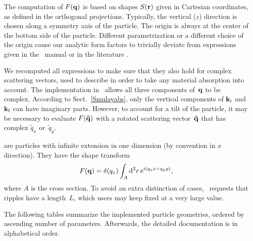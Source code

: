 The computation of $F(\mathbf{q})$ is based on
shapes $S(\mathbf{r})$ given in Cartesian coordinates,
as defined in the orthogonal projections.
Typically, the vertical ($z$) direction is chosen
along a symmetry axis of the particle.
The origin is always at the center of the bottom side of the particle.
Different parametrization or a different choice of the origin
cause our analytic form factors to trivially deviate
from expressions given in the \IsGISAXS\ manual \cite[Sect.~2.3]{Laz08}
or in the literature \cite[Appendix]{ReLL09}.

We recomputed all expressions to make sure
that they also hold for complex scattering vectors,
used to describe in order to take any material absorption into account.
The implementation in \BornAgain\ allows all three components
of~$\mathbf{q}$ to be complex.
According to Sect.~\ref{Smulayabs},
only the vertical components of $\mathbf{k}_{\text{i}}$ and $\mathbf{k}_{\text{f}}$ can have imaginary parts.
However,
to account for a tilt of the particle,
it may be necessary to evaluate $F(\mathbf{\tilde q})$ with
a rotated scattering vector~$\mathbf{\tilde q}$
that has complex $\tilde q_x$ or~$\tilde q_y$.

%
 are particles with infinite extension in one dimension
(by convention in $x$ direction).
They have the shape transform 
\begin{equation}\label{eq:FFHard}
  F(\mathbf{q})=\delta(q_x)\int_A {\rm d}^2r\, {\rm e}^{i(q_x x+q_y y)},
\end{equation}
where $A$ is the cross section.
To avoid an extra distinction of cases,
\BornAgain\ requests that ripples have a  length~$L$,
which users may keep fixed at a very large value.

The following tables summarize the implemented particle geometries,
 ordered by ascending number of parameters.
Afterwards, the detailed documentation is in alphabetical order.

